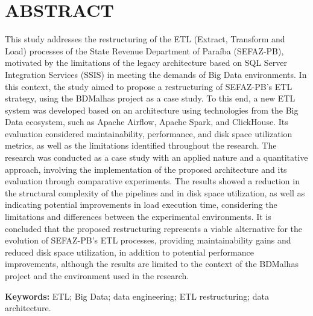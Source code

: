 
\thispagestyle{empty}
\section*{\normalsize \centering \textbf{ABSTRACT}}

\noindent 

This study addresses the restructuring of the ETL (Extract, Transform and Load) processes of the State Revenue 
Department of Paraíba (SEFAZ-PB), motivated by the limitations of the legacy architecture based on SQL Server 
Integration Services (SSIS) in meeting the demands of Big Data environments. In this context, the study aimed 
to propose a restructuring of SEFAZ-PB's ETL strategy, using the BDMalhas project as a case study. To this end, 
a new ETL system was developed based on an architecture using technologies from the Big Data ecosystem, such as 
Apache Airflow, Apache Spark, and ClickHouse. Its evaluation considered maintainability, performance, and disk 
space utilization metrics, as well as the limitations identified throughout the research. The research was 
conducted as a case study with an applied nature and a quantitative approach, involving the implementation of 
the proposed architecture and its evaluation through comparative experiments. The results showed a reduction in 
the structural complexity of the pipelines and in disk space utilization, as well as indicating potential 
improvements in load execution time, considering the limitations and differences between the experimental 
environments. It is concluded that the proposed restructuring represents a viable alternative for the evolution 
of SEFAZ-PB's ETL processes, providing maintainability gains and reduced disk space utilization, in addition
to potential performance improvements, although the results are limited to the context of
the BDMalhas project and the environment used in the research.

\vspace*{0.5cm}

\noindent\textbf{Keywords:} ETL; Big Data; data engineering; ETL restructuring; data architecture.
\newpage